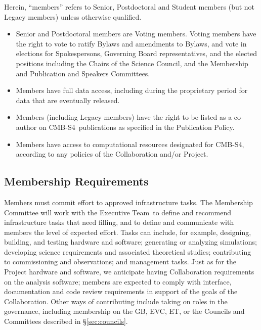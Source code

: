 \documentclass[12pt]{article}
\newcommand{\exec}{{Executive Team}}
\newcommand\collabname{CMB-S4}
\begin{document}
{Herein, ``members'' refers to Senior, Postdoctoral and Student members (but not Legacy members) unless otherwise qualified.  

\begin{itemize}

\item Senior and Postdoctoral members are Voting members.  Voting members  have the right to vote to ratify Bylaws and amendments to Bylaws, and vote in elections for Spokespersons, Governing Board representatives, and the elected positions including the Chairs of the Science Council, and the Membership and Publication and Speakers Committees. 

\item Members have full data access, including during the proprietary period for data that are eventually released.

\item Members (including Legacy members) have the right to be listed as a co-author on \collabname\ publications as specified in the Publication Policy.

\item Members have access to computational resources designated for \collabname, according to any policies of the Collaboration and/or Project.

\end{itemize}

\subsection{Membership Requirements}

Members must commit effort to approved infrastructure tasks. The Membership Committee will work with the \exec\ to define and recommend infrastructure tasks that need filling, and to define and communicate with members the level of expected effort. Tasks can include, for example, designing, building, and testing hardware and software; generating or analyzing simulations; developing science requirements and associated theoretical studies; contributing to commissioning and observations; and management tasks. Just as for the Project hardware and software, we anticipate having Collaboration requirements on the analysis software; members are expected to comply with interface, documentation and code review requirements in support of the goals of the Collaboration. Other ways of contributing include taking on roles in the governance, including membership on the GB, EVC, ET, or the Councils and Committees described in \S\ref{sec:councils}.

}
\end{document}
